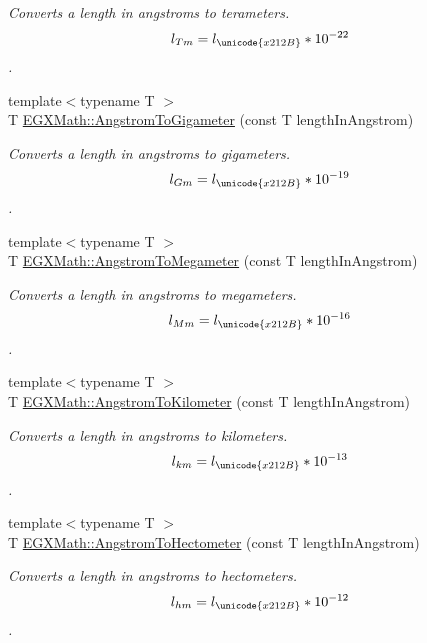 \begin{DoxyCompactItemize}
\begin{DoxyCompactList}\small\item\em Converts a length in angstroms to terameters. \[ l_{Tm}=l_{\unicode{x212B}} * 10^{-22} \]. \end{DoxyCompactList}\item 
{\footnotesize template$<$typename T $>$ }\\T \mbox{\hyperlink{group___e_g_x_math-_conversions-_length_conversions-_non-_s_i-_angstrom-_s_i_ga4f2ea6df8f1d3bb9dd787d97f8edc64d}{E\+G\+X\+Math\+::\+Angstrom\+To\+Gigameter}} (const T length\+In\+Angstrom)
\begin{DoxyCompactList}\small\item\em Converts a length in angstroms to gigameters. \[ l_{Gm}=l_{\unicode{x212B}} * 10^{-19} \]. \end{DoxyCompactList}\item 
{\footnotesize template$<$typename T $>$ }\\T \mbox{\hyperlink{group___e_g_x_math-_conversions-_length_conversions-_non-_s_i-_angstrom-_s_i_gae00a8e1d268242cc622c91e84f06f442}{E\+G\+X\+Math\+::\+Angstrom\+To\+Megameter}} (const T length\+In\+Angstrom)
\begin{DoxyCompactList}\small\item\em Converts a length in angstroms to megameters. \[ l_{Mm}=l_{\unicode{x212B}} * 10^{-16} \]. \end{DoxyCompactList}\item 
{\footnotesize template$<$typename T $>$ }\\T \mbox{\hyperlink{group___e_g_x_math-_conversions-_length_conversions-_non-_s_i-_angstrom-_s_i_gaff245672bc645b3b4a1d181669a3631e}{E\+G\+X\+Math\+::\+Angstrom\+To\+Kilometer}} (const T length\+In\+Angstrom)
\begin{DoxyCompactList}\small\item\em Converts a length in angstroms to kilometers. \[ l_{km}=l_{\unicode{x212B}} * 10^{-13} \]. \end{DoxyCompactList}\item 
{\footnotesize template$<$typename T $>$ }\\T \mbox{\hyperlink{group___e_g_x_math-_conversions-_length_conversions-_non-_s_i-_angstrom-_s_i_ga0f6fad35867be49511009edfdb4b7a0a}{E\+G\+X\+Math\+::\+Angstrom\+To\+Hectometer}} (const T length\+In\+Angstrom)
\begin{DoxyCompactList}\small\item\em Converts a length in angstroms to hectometers. \[ l_{hm}=l_{\unicode{x212B}} * 10^{-12} \]. \end{DoxyCompactList}\item 

\end{DoxyCompactItemize}
